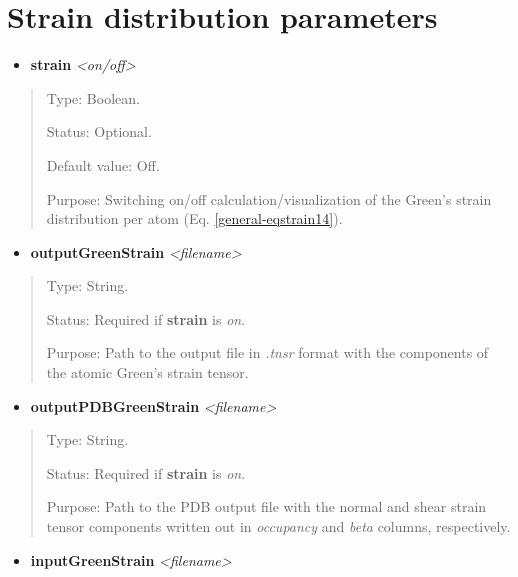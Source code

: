 \documentclass[letterpaper,10pt,english]{sphinxmanual}
\begin{document}
\section{Strain distribution parameters}
\label{general:strain-distribution-parameters}\begin{itemize}
\item {} 
\textbf{strain} \emph{\textless{}on/off\textgreater{}}

\end{itemize}
\begin{quote}

Type: Boolean.

Status: Optional.

Default value: Off.

Purpose: Switching on/off calculation/visualization of the Green's strain distribution per atom (Eq. \eqref{general-eqstrain14}).
\end{quote}
\begin{itemize}
\item {} 
\textbf{outputGreenStrain} \emph{\textless{}filename\textgreater{}}

\end{itemize}
\begin{quote}

Type: String.

Status: Required if \textbf{strain} is \emph{on}.

Purpose:  Path to the output file in \emph{.tnsr} format with the components of the atomic Green's strain tensor.
\end{quote}
\begin{itemize}
\item {} 
\textbf{outputPDBGreenStrain} \emph{\textless{}filename\textgreater{}}

\end{itemize}
\begin{quote}

Type: String.

Status: Required if \textbf{strain} is \emph{on}.

Purpose:  Path to the PDB output file with the normal and shear strain tensor components written out in \emph{occupancy} and \emph{beta} columns, respectively.
\end{quote}
\begin{itemize}
\item {} 
\textbf{inputGreenStrain} \emph{\textless{}filename\textgreater{}}

\end{itemize}
\end{document}
